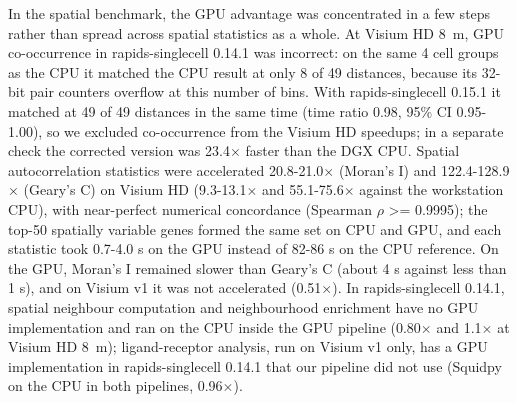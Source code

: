 \documentclass[runningheads]{llncs}
\begin{document}
In the spatial benchmark, the GPU advantage was concentrated in a few steps rather than spread across spatial statistics as a whole. At Visium HD 8~\textmu{}m, GPU co-occurrence in rapids-singlecell 0.14.1 was incorrect: on the same 4 cell groups as the CPU it matched the CPU result at only 8 of 49 distances, because its 32-bit pair counters overflow at this number of bins. With rapids-singlecell 0.15.1 it matched at 49 of 49 distances in the same time (time ratio 0.98, 95\% CI 0.95-1.00), so we excluded co-occurrence from the Visium HD speedups; in a separate check the corrected version was 23.4$\times$ faster than the DGX CPU. Spatial autocorrelation statistics were accelerated 20.8-21.0$\times$ (Moran's I) and 122.4-128.9$\times$ (Geary's C) on Visium HD (9.3-13.1$\times$ and 55.1-75.6$\times$ against the workstation CPU), with near-perfect numerical concordance (Spearman $\rho$ \textgreater= 0.9995); the top-50 spatially variable genes formed the same set on CPU and GPU, and each statistic took 0.7-4.0 s on the GPU instead of 82-86 s on the CPU reference. On the GPU, Moran's I remained slower than Geary's C (about 4 s against less than 1 s), and on Visium v1 it was not accelerated (0.51$\times$). In rapids-singlecell 0.14.1, spatial neighbour computation and neighbourhood enrichment have no GPU implementation and ran on the CPU inside the GPU pipeline (0.80$\times$ and 1.1$\times$ at Visium HD 8~\textmu{}m); ligand-receptor analysis, run on Visium v1 only, has a GPU implementation in rapids-singlecell 0.14.1 that our pipeline did not use (Squidpy on the CPU in both pipelines, 0.96$\times$).
\end{document}
